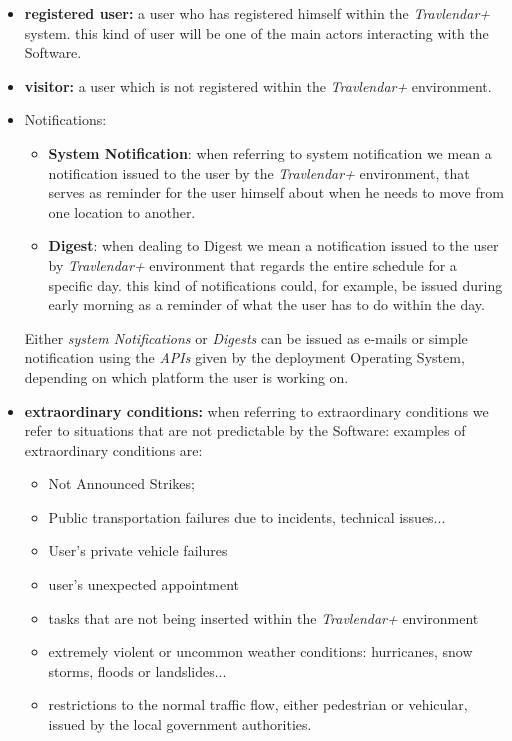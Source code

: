 \begin{itemize}
    \item \textbf{registered user:} a user who has registered himself within the \emph{Travlendar+} system. this kind of user will be one of the main actors interacting with the Software.
    
    \item \textbf{ visitor:} a user which is not registered within the \emph{Travlendar+} environment.
    
     \item Notifications: \begin{itemize}
     \item \textbf{System Notification}: when referring to system notification we mean a notification issued to the user by the \emph{Travlendar+} environment, that serves as reminder for the user himself about when he needs to move from one location to another. 
     \item \textbf{Digest}: when dealing to Digest we mean a notification issued to the user by \emph{Travlendar+} environment that regards the entire schedule for a specific day. this kind of notifications could, for example, be issued during early morning as a reminder of what the user has to do within the day.
     \end{itemize}
     Either \emph{system Notifications} or \emph{Digests } can be issued as e-mails or simple notification using the \emph{APIs} given by the deployment Operating System, depending on which platform the user is working on.   
     
     \item \textbf{extraordinary conditions:} when referring to extraordinary conditions we refer to situations that are not predictable by the Software: examples of extraordinary conditions are:
     \begin{itemize}
     \item Not Announced Strikes;
     \item Public transportation failures due to incidents, technical issues...
     \item User's private vehicle failures
     \item user's unexpected appointment
     \item tasks that are not being inserted within the \emph{Travlendar+} environment
     \item extremely violent or uncommon weather conditions: hurricanes, snow storms, floods or landslides...
     \item restrictions to the normal traffic flow, either pedestrian or vehicular, issued by the local government authorities.
     \end{itemize}
     

\end{itemize}
